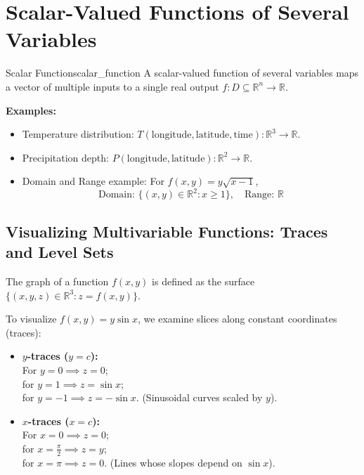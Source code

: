 \section{Scalar-Valued Functions of Several Variables}

\begin{definition}{Scalar Function}{scalar_function}
A scalar-valued function of several variables maps a vector of multiple inputs to a single real output $f: D \subseteq \mathbb{R}^n \to \mathbb{R}$.
\end{definition}

\textbf{Examples:}
\begin{itemize}
    \item Temperature distribution: $T(\text{longitude}, \text{latitude}, \text{time}): \mathbb{R}^3 \to \mathbb{R}$.
    \item Precipitation depth: $P(\text{longitude}, \text{latitude}): \mathbb{R}^2 \to \mathbb{R}$.
    \item Domain and Range example: For $f(x, y) = y\sqrt{x - 1}$,
    \[
    \text{Domain: } \{(x, y) \in \mathbb{R}^2 : x \geq 1\}, \quad \text{Range: } \mathbb{R}
    \]
\end{itemize}

\subsection{Visualizing Multivariable Functions: Traces and Level Sets}

The graph of a function $f(x, y)$ is defined as the surface $\{(x, y, z) \in \mathbb{R}^3 : z = f(x, y)\}$.

\begin{example}[Analyzing Traces of $f(x,y) = y\sin x$]
To visualize $f(x, y) = y \sin x$, we examine slices along constant coordinates (traces):

\begin{itemize}
    \item \textbf{$y$-traces ($y = c$):} \\
    For $y = 0 \implies z = 0$; \\
    for $y = 1 \implies z = \sin x$; \\
    for $y = -1 \implies z = -\sin x$. (Sinusoidal curves scaled by $y$). 
    \item \textbf{$x$-traces ($x = c$):} \\
    For $x = 0 \implies z = 0$; \\
    for $x = \frac{\pi}{2} \implies z = y$; \\
    for $x = \pi \implies z = 0$. (Lines whose slopes depend on $\sin x$). 
\end{itemize}
\end{example}

